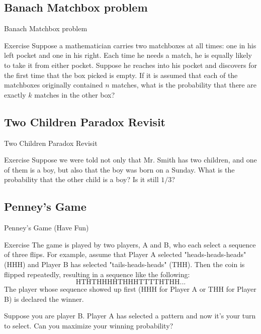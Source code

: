\documentclass{beamer}
\begin{document}
\subsection{Banach Matchbox problem}
\begin{frame}{Banach Matchbox problem}
\begin{block}{Exercise}
Suppose a mathematician carries two matchboxes at all times: one in his left pocket and one in his right. Each time he needs a match, he is equally likely to take it from either pocket. Suppose he reaches into his pocket and discovers for the first time that the box picked is empty. If it is assumed that each of the matchboxes originally contained $n$ matches, what is the probability that there are exactly $k$ matches in the other box?
\end{block}
\end{frame}


\subsection{Two Children Paradox Revisit}
\begin{frame}{Two Children Paradox Revisit}
\begin{block}{Exercise}
Suppose we were told not only that Mr. Smith has two children, and one of them is a boy, but also that the boy was born on a Sunday. What is the probability that the other child is a boy? Is it still $1/3$?
\end{block}
\end{frame}

\subsection{Penney's Game}
\begin{frame}{Penney's Game (Have Fun)}
\begin{block}{Exercise}
The game is played by two players, A and B, who each select a sequence of three flips. For example, assume that Player A selected "heads-heads-heads" (HHH) and Player B has selected "tails-heads-heads" (THH). Then the coin is flipped repeatedly, resulting in a sequence like the following:
$$\text{HTHTHHHHTHHHTTTTHTHH...}$$
The player whose sequence showed up first (HHH for Player A or THH for Player B) is declared the winner.

Suppose you are player B. Player A has selected a pattern and now it's your turn to select. Can you maximize your winning probability?
\end{block}
\end{frame}
\end{document}
